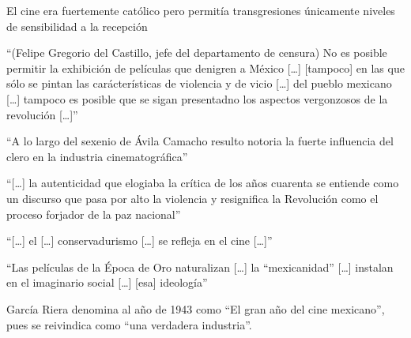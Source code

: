 \begin{compactitem}
\item El cine era fuertemente católico pero permitía transgresiones únicamente niveles de sensibilidad a la recepción\autocite[48]{tierney_myths_2002}
\item ``(Felipe Gregorio del Castillo, jefe del departamento de censura) No es posible permitir la exhibición de películas que denigren a México [\ldots] [tampoco] en las que sólo se pintan  las carácterísticas de violencia y de vicio [\ldots] del pueblo mexicano [\ldots] tampoco es posible que se sigan presentadno los aspectos vergonzosos de la revolución [\ldots]''\autocite[111]{garcia_riera_historia_1992}
\item ``A lo largo del sexenio de Ávila Camacho resulto notoria la fuerte influencia del clero en la industria cinematográfica''\autocite[12]{garcia_riera_historia_1992}
\item ``[\ldots] la autenticidad que elogiaba la crítica de los años cuarenta se entiende como un discurso que pasa por alto la violencia y resignifica la Revolución como el proceso forjador de la paz nacional''\autocite[370]{sanchez_vi._2010}
\item ``[\ldots] el [\ldots] conservadurismo [\ldots] se refleja en el cine [\ldots]''\autocite[179]{guerrero_imagen_2005}
\item ``Las películas de la Época de Oro naturalizan [\ldots] la ``mexicanidad'' [\ldots] instalan en el imaginario social [\ldots] [esa] ideología''\autocite[12]{silva_escobar_epoca_2011}
\item García Riera denomina al año de 1943 como ``El gran año del cine mexicano'', pues se reivindica como ``una verdadera industria''.\autocite[7]{garcia_riera_historia_1992}
\end{compactitem} 


